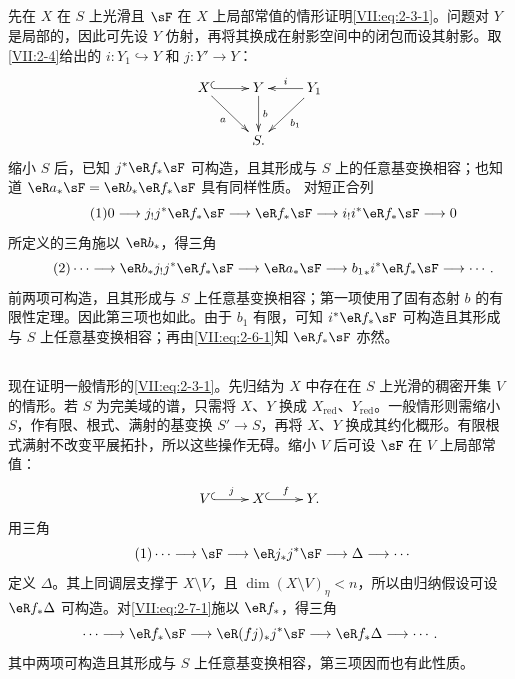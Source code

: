 \subsection{}\label{VII:2-6}
先在 $X$ 在 $S$ 上光滑且 $\sF$ 在 $X$ 上局部常值的情形证明\eqref{VII:eq:2-3-1}。问题对 $Y$ 是局部的，因此可先设 $Y$ 仿射，再将其换成在射影空间中的闭包而设其射影。取\ref{VII:2-4}给出的 $i:Y_1\hookrightarrow Y$ 和 $j:Y'\to Y$：
\[\xymatrix{X\ar@{^{(}->}[r]\ar[dr]_-a&Y\ar[d]^-b&Y_1\ar[l]_-i\ar[dl]^-{b_1}\\&S.}\]
缩小 $S$ 后，已知 $j^\ast\eR f_\ast\sF$ 可构造，且其形成与 $S$ 上的任意基变换相容；也知道 $\eR a_\ast\sF=\eR b_\ast\eR f_\ast\sF$ 具有同样性质。
对短正合列
\begin{equation*}\tag{1}\label{VII:eq:2-6-1}
 0\longrightarrow j_!j^\ast\eR f_\ast\sF\longrightarrow\eR f_\ast\sF\longrightarrow i_!i^\ast\eR f_\ast\sF\longrightarrow0
\end{equation*}
所定义的三角施以 $\eR b_\ast$，得三角
\begin{equation*}\tag{2}\label{VII:eq:2-6-2}
 \cdots\longrightarrow\eR b_\ast j_!j^\ast\eR f_\ast\sF\longrightarrow\eR a_\ast\sF\longrightarrow {b_1}_\ast i^\ast\eR f_\ast\sF\longrightarrow\cdots.
\end{equation*}
前两项可构造，且其形成与 $S$ 上任意基变换相容；第一项使用了固有态射 $b$ 的有限性定理。因此第三项也如此。由于 $b_1$ 有限，可知 $i^\ast\eR f_\ast\sF$ 可构造且其形成与 $S$ 上任意基变换相容；再由\eqref{VII:eq:2-6-1}知 $\eR f_\ast\sF$ 亦然。
\subsection{}\label{VII:2-7}
现在证明一般情形的\eqref{VII:eq:2-3-1}。先归结为 $X$ 中存在在 $S$ 上光滑的稠密开集 $V$ 的情形。若 $S$ 为完美域的谱，只需将 $X$、$Y$ 换成 $X_{\mathrm{red}}$、$Y_{\mathrm{red}}$。一般情形则需缩小 $S$，作有限、根式、满射的基变换 $S'\to S$，再将 $X$、$Y$ 换成其约化概形。有限根式满射不改变平展拓扑，所以这些操作无碍。缩小 $V$ 后可设 $\sF$ 在 $V$ 上局部常值：
\[\xymatrix{V\ar@{^{(}->}[r]^-j&X\ar@{^{(}->}[r]^-f&Y.}\]
用三角
\begin{equation*}\tag{1}\label{VII:eq:2-7-1}
 \cdots\longrightarrow\sF\longrightarrow\eR j_\ast j^\ast\sF\longrightarrow\Delta\longrightarrow\cdots
\end{equation*}
定义 $\Delta$。其上同调层支撑于 $X\setminus V$，且 $\dim(X\setminus V)_\eta<n$，所以由归纳假设可设 $\eR f_\ast\Delta$ 可构造。对\eqref{VII:eq:2-7-1}施以 $\eR f_\ast$，得三角
\[
 \cdots\longrightarrow\eR f_\ast\sF\longrightarrow\eR(fj)_\ast j^\ast\sF\longrightarrow\eR f_\ast\Delta\longrightarrow\cdots.
\]
其中两项可构造且其形成与 $S$ 上任意基变换相容，第三项因而也有此性质。
